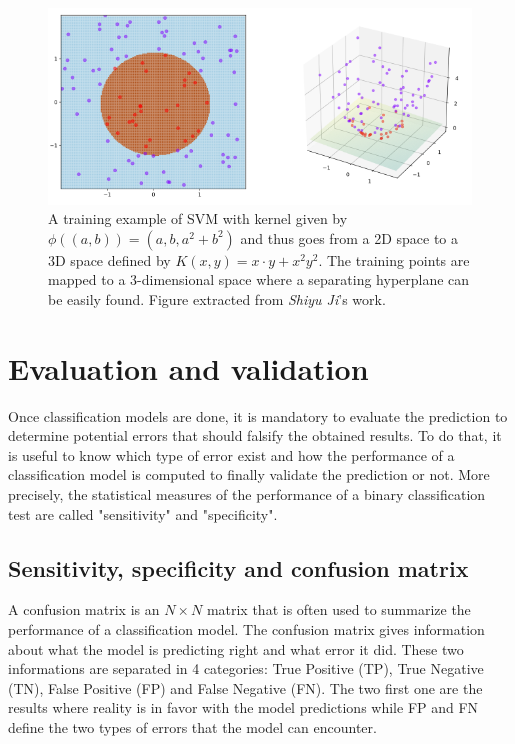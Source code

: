 \documentclass[11pt, openany]{report}
\theoremstyle{plain}
\theoremstyle{definition}
\theoremstyle{remark}
\begin{document}
\begin{figure}[h]
  \centering
  \includegraphics[scale=0.65]{figures/kernel-trick.png}
  \caption{A training example of SVM with kernel given by $\phi((a, b)) = (a, b, a^{2} + b^{2})$ and thus goes from a 2D space to a 3D space defined by $K(x, y) = x \cdot y + x^2 y^2$. The training points are mapped to a 3-dimensional space where a separating hyperplane can be easily found. Figure extracted from \textit{Shiyu Ji}'s work\protect\footnotemark.}
  \label{fig:kernel-trick}
\end{figure}


\newpage
\section{Evaluation and validation} \label{sec:evaluation}
 
Once classification models are done, it is mandatory to evaluate the prediction to determine potential errors that should falsify the obtained results.  To do that, it is useful to know which type of error exist and how the performance of a classification model is computed to finally validate the prediction or not. More precisely, the statistical measures of the performance of a binary classification test are called  "sensitivity" and "specificity". 

\subsection{Sensitivity, specificity and confusion matrix}
A confusion matrix is an $N \times N$ matrix that is often used to summarize the performance of a classification model. The confusion matrix gives information about what the model is predicting right and what error it did. These two informations are separated in 4 categories: True Positive (TP), True Negative (TN), False Positive (FP) and False Negative (FN). The two first one are the results where reality is in favor with the model predictions while FP and FN define the two types of errors that the model can encounter.
\end{document}
